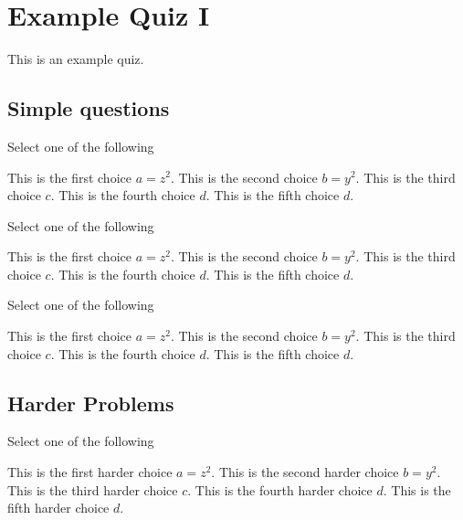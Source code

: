 \chapter{Example Quiz I}
\label{XXch:sets}

\begin{preamble}
This is an example quiz.
\end{preamble}


\section{Simple questions}
\label{XXsec:sets::math}


\begin{problem}[Choices I]
Select one of the following
\begin{choices}
\choice This is the first choice $a = z^2$.
\choice This is the second choice $b = y^2$.
\correctchoice This is the third choice $c$.
\correctchoice This is the fourth choice $d$.
\choice This is the fifth choice $d$.
\end{choices}
\end{problem}


\begin{problem}[Choices II]
Select one of the following
\begin{choices}
\choice This is the first choice $a = z^2$.
\choice This is the second choice $b = y^2$.
\correctchoice This is the third choice $c$.
\correctchoice This is the fourth choice $d$.
\choice This is the fifth choice $d$.
\end{choices}
\end{problem}

\begin{problem}
Select one of the following
\begin{choices}
\choice This is the first choice $a = z^2$.
\choice This is the second choice $b = y^2$.
\correctchoice This is the third choice $c$.
\correctchoice This is the fourth choice $d$.
\choice This is the fifth choice $d$.
\end{choices}
\end{problem}


\section{Harder Problems}

\begin{problem}
Select one of the following
\begin{choices}
\choice This is the first harder choice $a = z^2$.
\choice This is the second harder choice $b = y^2$.
\correctchoice This is the third harder choice $c$.
\correctchoice This is the fourth harder choice $d$.
\choice This is the fifth harder choice $d$.
\end{choices}
\end{problem}


